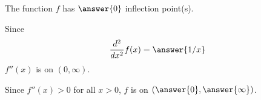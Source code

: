 \documentclass{ximera}
\begin{document}
\begin{exercise}
\begin{exercise}
\begin{exercise}
\begin{exercise}
\begin{exercise}
\begin{exercise}
\begin{exercise}
\begin{exercise}
\begin{exercise}
\begin{exercise}
\begin{exercise}
\begin{exercise}
\begin{exercise}
The function $f$ has $\answer{0}$ inflection point(s).
\begin{exercise}
Since
\[
\frac{d^2}{dx^2}f(x)=\answer{1/x}
\]
$f''(x)$ is  on $(0,\infty)$. 
\begin{exercise}
Since $f''(x)>0$ for all $x>0$, $f$ is  on $(\answer{0},\answer{\infty})$.
\end{exercise}
\end{exercise}
\end{exercise}
\end{exercise}
\end{exercise}
\end{exercise}
\end{exercise}
\end{exercise}
\end{exercise}
\end{exercise}
\end{exercise}
\end{exercise}
\end{exercise}
\end{exercise}
\end{exercise}
\end{document}
